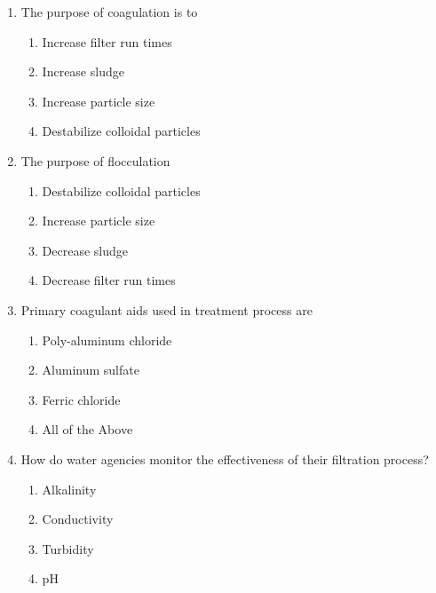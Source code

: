 \begin{enumerate}
\item  The purpose of coagulation is to\\
\begin{enumerate}
\item Increase filter run times\\
\item Increase sludge\\
\item Increase particle size\\
\item Destabilize colloidal particles
\end{enumerate}

\item  The purpose of flocculation\\
\begin{enumerate}
\item Destabilize colloidal particles\\
\item Increase particle size\\
\item Decrease sludge\\
\item Decrease filter run times
\end{enumerate}

\item  Primary coagulant aids used in treatment process are\\
\begin{enumerate}
\item Poly-aluminum chloride\\
\item Aluminum sulfate\\
\item Ferric chloride\\
\item All of the Above
\end{enumerate}

\item  How do water agencies monitor the effectiveness of their filtration process?\\
\begin{enumerate}
\item Alkalinity\\
\item Conductivity\\
\item Turbidity\\
\item $\mathrm{pH}$
\end{enumerate}



\end{enumerate}
